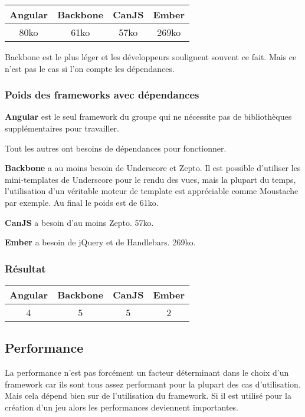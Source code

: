 \begin{tabular}{|c|c|c|c|}
  \hline 
  Angular & Backbone & CanJS & Ember \\
  \hline 
  80ko & 61ko & 57ko & 269ko \\
  \hline
\end{tabular}

Backbone est le plus léger et les développeurs soulignent souvent ce fait. Mais ce n’est pas le cas si l’on compte les dépendances.

\subsubsection{Poids des frameworks avec dépendances}

\textbf{Angular} est le seul framework du groupe qui ne nécessite pas de bibliothèques supplémentaires pour travailler.

Tout les autres ont besoins de dépendances pour fonctionner.

\textbf{Backbone} a au moins besoin de Underscore et Zepto. Il est possible d’utiliser les mini-templates de Underscore pour le rendu des vues, mais la plupart du temps, l’utilisation d’un véritable moteur de template est appréciable comme Moustache par exemple. Au final le poids est de 61ko.

\textbf{CanJS} a besoin d’au moins Zepto. 57ko.

\textbf{Ember} a besoin de jQuery et de Handlebars. 269ko.

\subsubsection{Résultat}
\begin{tabular}{|c|c|c|c|}
  \hline 
  Angular & Backbone & CanJS & Ember \\
  \hline 
  4 & 5 & 5 & 2 \\
  \hline
\end{tabular}


\subsection{Performance}

La performance n’est pas forcément un facteur déterminant dans le choix d’un framework car ils sont tous assez performant pour la plupart des cas d’utilisation. Mais cela dépend bien sur de l’utilisation du framework. Si il est utilisé pour la création d’un jeu alors les performances deviennent importantes.

